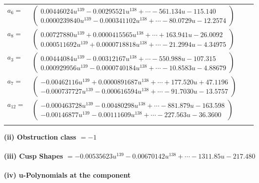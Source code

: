 \documentclass[1p]{elsarticle_modified}
\theoremstyle{definition}
\begin{document}
\begin{tabular}{m{7pt} m{180pt} m{7pt} m{180pt} }
\flushright $a_{6}=$&$\begin{pmatrix}0.00446024 u^{139}-0.00295521 u^{138}+\cdots-561.134 u-115.140\\0.0000239840 u^{139}-0.000341102 u^{138}+\cdots-80.0729 u-12.2574\end{pmatrix}$ \\
\flushright $a_{8}=$&$\begin{pmatrix}0.00727880 u^{139}+0.0000415565 u^{138}+\cdots+163.941 u-26.0092\\0.000511692 u^{139}+0.0000718818 u^{138}+\cdots-21.2994 u-4.34975\end{pmatrix}$ \\
\flushright $a_{3}=$&$\begin{pmatrix}0.00444084 u^{139}-0.00312167 u^{138}+\cdots-550.988 u-107.315\\0.000929956 u^{139}-0.0000740184 u^{138}+\cdots-10.8583 u-4.88679\end{pmatrix}$ \\
\flushright $a_{7}=$&$\begin{pmatrix}-0.00462116 u^{139}+0.0000891687 u^{138}+\cdots+177.520 u+47.1196\\-0.000737727 u^{139}-0.000616594 u^{138}+\cdots-91.7030 u-13.5757\end{pmatrix}$ \\
\flushright $a_{12}=$&$\begin{pmatrix}-0.000463728 u^{139}-0.00480298 u^{138}+\cdots-881.879 u-163.598\\-0.00146877 u^{139}-0.00111609 u^{138}+\cdots-227.563 u-36.3600\end{pmatrix}$\\&\end{tabular}
\flushleft \textbf{(ii) Obstruction class $= -1$}\\~\\
\flushleft \textbf{(iii) Cusp Shapes $= -0.00535623 u^{139}-0.00670142 u^{138}+\cdots-1311.85 u-217.480$}\\~\\
\newpage\renewcommand{\arraystretch}{1}
\flushleft \textbf{(iv) u-Polynomials at the component}\newline \\
\end{document}

